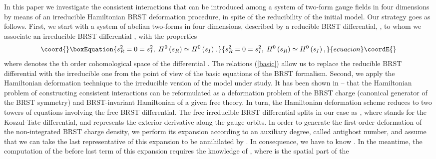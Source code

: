 \documentclass[a4paper,12pt]{article}
\begin{document}
In this paper we investigate the consistent interactions that can be
introduced among a system of two-form gauge fields in four dimensions by
means of an irreducible Hamiltonian BRST deformation procedure, in spite of
the reducibility of the initial model. Our strategy goes as follows. First,
we start with a system of abelian two-forms in four dimensions, described by
a reducible BRST differential, \coordHE{}, to whom we associate an irreducible
BRST differential \coordHE{}, with the properties 
\begin{equation}\coord{}\boxEquation{
s_{R}^{2}=0=s_{I}^{2},\;H^{0}\left( s_{R}\right) \simeq H^{0}\left(
s_{I}\right) ,  \label{basic}
}{
s_{R}^{2}=0=s_{I}^{2},\;H^{0}\left( s_{R}\right) \simeq H^{0}\left(
s_{I}\right) ,  }{ecuacion}\coordE{}\end{equation}
where \coordHE{} denotes the \coordHE{}th order cohomological space of
the differential \coordHE{}. The relations (\ref{basic}) allow us to replace the
reducible BRST differential with the irreducible one from the point of view
of the basic equations of the BRST formalism. Second, we apply the
Hamiltonian deformation technique to the irreducible version of the model
under study. It has been shown in \cite{25}--\cite{28} that the Hamiltonian
problem of constructing consistent interactions can be reformulated as a
deformation problem of the BRST charge (canonical generator of the BRST
symmetry) and BRST-invariant Hamiltonian of a given free theory. In turn,
the Hamiltonian deformation scheme reduces to two towers of equations
involving the free BRST differential. The free irreducible BRST differential
splits in our case as \coordHE{}, where \coordHE{}
stands for the Koszul-Tate differential, and \coordHE{} represents the
exterior derivative along the gauge orbits. In order to generate the
first-order deformation of the non-integrated BRST charge density, we
perform its expansion according to an auxiliary degree, called antighost
number, and assume that we can take the last representative of this
expansion to be annihilated by \coordHE{}. In consequence, we have to
know \coordHE{}. In the meantime, the computation of the
before last term of this expansion requires the knowledge of \coordHE{}, where \coordHE{} is the spatial part of the
\end{document}
